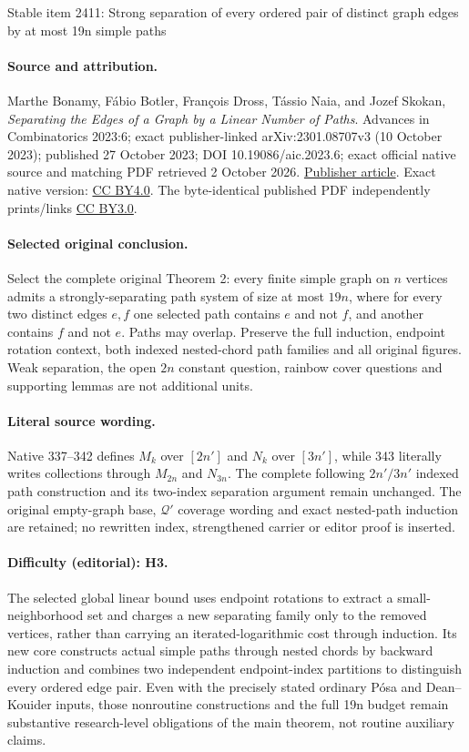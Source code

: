 \documentclass[11pt]{article}
\begin{document}
\begin{center}{\Large Stable item 2411: Strong separation of every ordered pair of distinct graph edges by at most 19n simple paths}\end{center}
\paragraph{Source and attribution.} Marthe Bonamy, Fábio Botler, François Dross, Tássio Naia, and Jozef Skokan, \emph{Separating the Edges of a Graph by a Linear Number of Paths}. Advances in Combinatorics 2023:6; exact publisher-linked arXiv:2301.08707v3 (10 October 2023); published 27 October 2023; DOI 10.19086/aic.2023.6; exact official native source and matching PDF retrieved 2 October 2026. \href{https://www.advancesincombinatorics.com/article/88916-separating-the-edges-of-a-graph-by-a-linear-number-of-paths}{Publisher article}. Exact native version: \href{https://creativecommons.org/licenses/by/4.0/}{CC BY4.0}. The byte-identical published PDF independently prints/links \href{https://creativecommons.org/licenses/by/3.0/}{CC BY3.0}.
\paragraph{Selected original conclusion.} Select the complete original Theorem 2: every finite simple graph on \(n\) vertices admits a strongly-separating path system of size at most \(19n\), where for every two distinct edges \(e,f\) one selected path contains \(e\) and not \(f\), and another contains \(f\) and not \(e\). Paths may overlap. Preserve the full induction, endpoint rotation context, both indexed nested-chord path families and all original figures. Weak separation, the open \(2n\) constant question, rainbow cover questions and supporting lemmas are not additional units.
\paragraph{Literal source wording.} Native 337--342 defines \(M_k\) over \([2n']\) and \(N_k\) over \([3n']\), while 343 literally writes collections through \(M_{2n}\) and \(N_{3n}\). The complete following \(2n'/3n'\) indexed path construction and its two-index separation argument remain unchanged. The original empty-graph base, \(\mathcal Q'\) coverage wording and exact nested-path induction are retained; no rewritten index, strengthened carrier or editor proof is inserted.
\paragraph{Difficulty (editorial): H3.} The selected global linear bound uses endpoint rotations to extract a small-neighborhood set and charges a new separating family only to the removed vertices, rather than carrying an iterated-logarithmic cost through induction. Its new core constructs actual simple paths through nested chords by backward induction and combines two independent endpoint-index partitions to distinguish every ordered edge pair. Even with the precisely stated ordinary Pósa and Dean–Kouider inputs, those nonroutine constructions and the full 19n budget remain substantive research-level obligations of the main theorem, not routine auxiliary claims.
\end{document}
